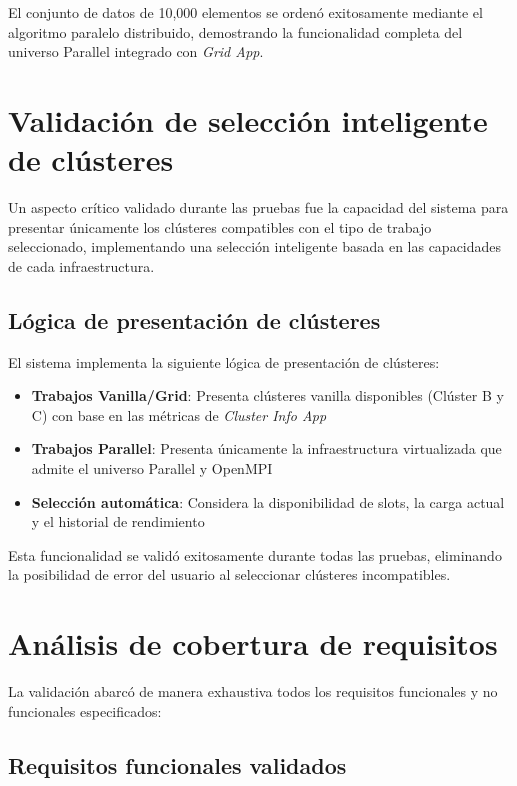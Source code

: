El conjunto de datos de 10,000 elementos se ordenó exitosamente mediante el algoritmo paralelo distribuido, demostrando la funcionalidad completa del universo Parallel integrado con \textit{Grid App}.

\section{Validación de selección inteligente de clústeres}
\noindent

Un aspecto crítico validado durante las pruebas fue la capacidad del sistema para presentar únicamente los clústeres compatibles con el tipo de trabajo seleccionado, implementando una selección inteligente basada en las capacidades de cada infraestructura.

\subsection{Lógica de presentación de clústeres}
\noindent

El sistema implementa la siguiente lógica de presentación de clústeres:

\begin{itemize}
	\item \textbf{Trabajos Vanilla/Grid}: Presenta clústeres vanilla disponibles (Clúster B y C) con base en las métricas de \textit{Cluster Info App}
	\item \textbf{Trabajos Parallel}: Presenta únicamente la infraestructura virtualizada que admite el universo Parallel y OpenMPI
	\item \textbf{Selección automática}: Considera la disponibilidad de slots, la carga actual y el historial de rendimiento
\end{itemize}

Esta funcionalidad se validó exitosamente durante todas las pruebas, eliminando la posibilidad de error del usuario al seleccionar clústeres incompatibles.

\section{Análisis de cobertura de requisitos}
\noindent

La validación abarcó de manera exhaustiva todos los requisitos funcionales y no funcionales especificados:

\subsection{Requisitos funcionales validados}
\noindent

